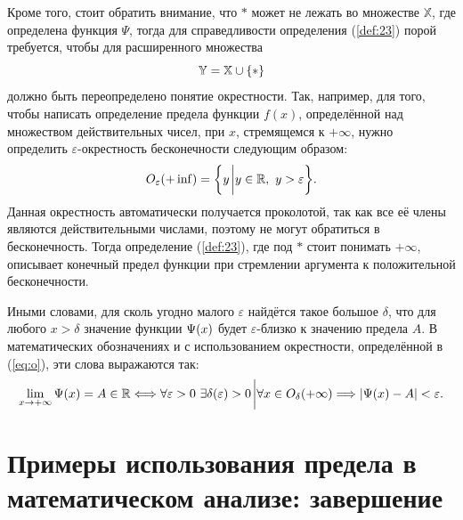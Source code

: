 \documentclass[12pt]{article}
\begin{document}
Кроме того, стоит обратить внимание, что $*$ может не лежать во множестве $\mathbb{X}$, где определена функция $\Psi$, тогда для справедливости определения (\ref{def:23}) порой требуется, чтобы для расширенного множества 
\begin{equation}
    \mathbb{Y} = \mathbb{X}\cup\qty{*}
\end{equation}
должно быть переопределено понятие окрестности. Так, например, для того, чтобы написать определение предела функции $f(x)$, определённой над множеством действительных чисел, при $x$, стремящемся к $+\infty$, нужно определить $\varepsilon$\--окрестность бесконечности следующим образом:
\begin{equation}\label{eq:o}
    O_\varepsilon\qty(+\inf) = \qty{y\eval y\in \mathbb{R}, \ y > \varepsilon}.
\end{equation}
Данная окрестность автоматически получается проколотой, так как все её члены являются действительными числами, поэтому не могут обратиться в бесконечность. Тогда определение (\ref{def:23}), где под $*$ стоит понимать $+\infty$, описывает конечный предел функции при стремлении аргумента к положительной бесконечности.
\par
Иными словами, для сколь угодно малого $\varepsilon$ найдётся такое большое $\delta$, что для любого $x>\delta$ значение функции $\Psi\qty(x)$ будет $\varepsilon$\--близко к значению предела $A$. В математических обозначениях и с использованием окрестности, определённой в (\ref{eq:o}), эти слова выражаются так:
\begin{equation}
    \lim_{x\rightarrow +\infty}{\Psi \qty(x)} = A \in \mathbb{R} \Longleftrightarrow \forall \varepsilon > 0\ \exists \delta\qty(\varepsilon) > 0 \eval \forall x \in O_\delta\qty(+\infty) \Longrightarrow \abs{\Psi\qty(x) - A} < \varepsilon.
\end{equation}


\section{Примеры использования предела в математическом анализе: завершение}
\end{document}
